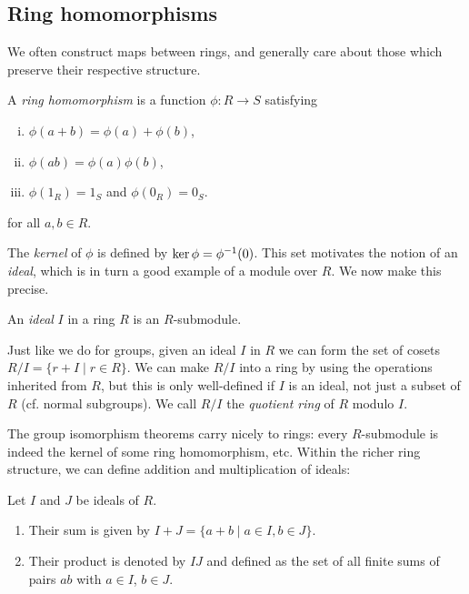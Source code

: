 \subsection{Ring homomorphisms}

We often construct maps between rings, and generally care about those which preserve their respective structure.

\begin{defn}[lang II, \S 1]
	A \emph{ring homomorphism} is a function $\phi:R\to S$ satisfying
	\begin{enumerate}[(i)]
		\item $\phi(a+b)=\phi(a)+\phi(b)$,
		\item $\phi(ab)=\phi(a)\phi(b)$,
		\item $\phi(1_R) = 1_S$ and $\phi(0_R)=0_S$.
	\end{enumerate}
	for all $a,b\in R$.
\end{defn}

The \emph{kernel} of $\phi$ is defined by $\ker\phi=\phi^{-1}(0)$. This set motivates the notion of an \emph{ideal}, which is in turn a good example of a module over $R$. We now make this precise.

\begin{defn}
	An \emph{ideal} $I$ in a ring $R$ is an $R$-submodule.
\end{defn}

Just like we do for groups, given an ideal $I$ in $R$ we can form the set of cosets $R/I = \{r+I \mid r\in R\}$. We can make $R/I$ into a ring by using the operations inherited from $R$, but this is only well-defined if $I$ is an ideal, not just a subset of $R$ (cf. normal subgroups). We call $R/I$ the \emph{quotient ring} of $R$ modulo $I$.

The group isomorphism theorems carry nicely to rings: every $R$-submodule is indeed the kernel of some ring homomorphism, etc. Within the richer ring structure, we can define addition and multiplication of ideals:

\begin{defn}
	Let $I$ and $J$ be ideals of $R$.
	\begin{enumerate}[(1)]
		\item Their sum is given by $I+J=\{a+b \mid a\in I, b\in J\}$.
		\item Their product is denoted by $IJ$ and defined as the set of all finite sums of pairs $ab$ with $a\in I$, $b\in J$.
	\end{enumerate}
\end{defn}

